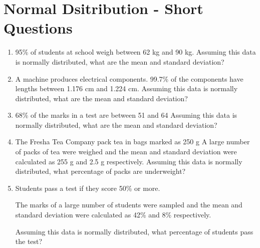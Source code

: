 \documentclass[french]{article}
\begin{document}

\section*{Normal Dsitribution - Short Questions}


\begin{enumerate}
\item 95\% of students at school weigh between 62 kg and 90 kg.
Assuming this data is normally distributed, what are the mean and standard deviation?

\item A machine produces electrical components.
99.7\% of the components have lengths between 1.176 cm and 1.224 cm.
Assuming this data is normally distributed, what are the mean and standard deviation?

\item 68\% of the marks in a test are between 51 and 64
Assuming this data is normally distributed, what are the mean and standard deviation?

\item The Fresha Tea Company pack tea in bags marked as 250 g
A large number of packs of tea were weighed and the mean and standard deviation were calculated as 255 g and 2.5 g respectively.
Assuming this data is normally distributed, what percentage of packs are underweight?

\item Students pass a test if they score 50\% or more.

The marks of a large number of students were sampled and the mean and standard deviation were calculated as 42\% and 8\% respectively.

Assuming this data is normally distributed, what percentage of students pass the test?

\end{enumerate}
\end{document}
